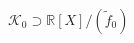 \documentclass[preview]{standalone}
\begin{document}
\begin{center}
$ \mathcal{K}_0 \supset \mathbb{R}[X]/(\tilde{f}_0)$
\end{center}
\end{document}
